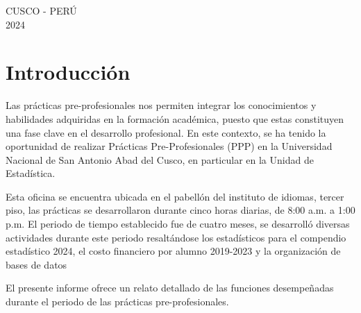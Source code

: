 \documentclass[
  12pt,
  letterpaper,
]{scrreprt}
\renewcommand*\contentsname{Tabla de contenidos}
\newcommand\contentsname{Tabla de contenidos}
\begin{document}
\begin{minipage}[b][\textheight][s]{0.85\textwidth}
{}

\vfill

\centering
\Large{CUSCO - PERÚ} \\
\Large{2024}
\vspace{0.1\textheight} 
\end{minipage}



\pagebreak %


\setlength{\parindent}{1.5em}

\renewcommand*\contentsname{Índice general}
{
\hypersetup{linkcolor=}
\setcounter{tocdepth}{2}
\tableofcontents
}
\listoffigures


\chapter{Introducción}\label{introducciuxf3n}


Las prácticas pre-profesionales nos permiten integrar los conocimientos
y habilidades adquiridas en la formación académica, puesto que estas
constituyen una fase clave en el desarrollo profesional. En este
contexto, se ha tenido la oportunidad de realizar Prácticas
Pre-Profesionales (PPP) en la Universidad Nacional de San Antonio Abad
del Cusco, en particular en la Unidad de Estadística.

Esta oficina se encuentra ubicada en el pabellón del instituto de
idiomas, tercer piso, las prácticas se desarrollaron durante cinco horas
diarias, de 8:00 a.m. a 1:00 p.m. El periodo de tiempo establecido fue
de cuatro meses, se desarrolló diversas actividades durante este periodo
resaltándose los estadísticos para el compendio estadístico 2024, el
costo financiero por alumno 2019-2023 y la organización de bases de
datos

El presente informe ofrece un relato detallado de las funciones
desempeñadas durante el periodo de las prácticas pre-profesionales.
\end{document}
